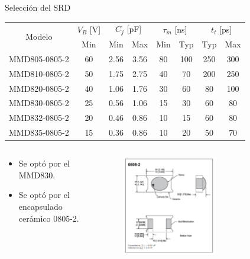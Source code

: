 \documentclass{beamer}
\begin{document}
\begin{frame}{Selección del SRD}

    \begin{table}[t]
    \centering
    {\tiny
    \begin{tabular}{|c|c|c|c|c|c|c|c|}
    \hline
        \multirow{2}{*}{Modelo} & $V_B$ [V] &
        \multicolumn{2}{c|}{$C_j$ [pF]} & \multicolumn{2}{c|}{$\tau_m$ [ns]} &
        \multicolumn{2}{c|}{$t_t$ [ps]} \\
    \cline{2-8}
        & Min & Min & Max & Min & Typ & Typ & Max \\
    \hline
    MMD805-0805-2 & 60 & 2.56 & 3.56 & 80 & 100 & 250 & 300 \\
    MMD810-0805-2 & 50 & 1.75 & 2.75 & 40 & 70  & 200 & 250 \\
    MMD820-0805-2 & 40 & 1.06 & 1.76 & 30 & 60  & 80  & 100 \\
    MMD830-0805-2 & 25 & 0.56 & 1.06 & 15 & 30  & 60  & 80 \\
    MMD832-0805-2 & 20 & 0.46 & 0.86 & 10 & 15  & 60  & 80 \\
    MMD835-0805-2 & 15 & 0.36 & 0.86 & 10 & 20  & 50  & 70 \\
    \hline
    \end{tabular}
    }
    \label{tab:mmdx_performance}
    \end{table}
    \begin{columns}[T]
        \begin{column}{0.3\textwidth}
            \vspace{1cm}
            \begin{itemize}
                \item Se optó por el MMD830.
                \item Se optó por el encapsulado cerámico 0805-2.
            \end{itemize}
        \end{column}
        \begin{column}{0.7\textwidth}
            \begin{figure}[t]
                \centering
                \includegraphics[width=0.6\textwidth]{images/srd_0805_outline.jpg}
                \label{fig:srd_0805_outline}
            \end{figure}
        \end{column}
    \end{columns}

\end{frame}
\end{document}
